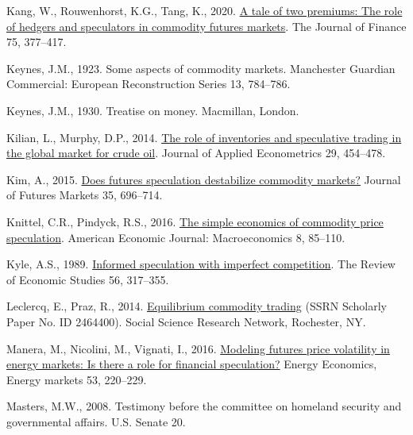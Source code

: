 \documentclass[]{elsarticle} %
\newlength{\cslhangindent}
\newlength{\cslentryspacingunit} %
\newenvironment{CSLReferences}[2] %
 {%
  \setlength{\parindent}{0pt}
  \ifodd #1
  \let\oldpar\par
  \def\par{\hangindent=\cslhangindent\oldpar}
  \fi
  \setlength{\parskip}{#2\cslentryspacingunit}
 }%
 {}
\begin{document}
\begin{CSLReferences}{1}{0}
\leavevmode{}%
Kang, W., Rouwenhorst, K.G., Tang, K., 2020. \href{https://doi.org/10.1111/jofi.12845}{A tale of two premiums: The role of hedgers and speculators in commodity futures markets}. The Journal of Finance 75, 377--417.

\leavevmode{}%
Keynes, J.M., 1923. Some aspects of commodity markets. Manchester Guardian Commercial: European Reconstruction Series 13, 784--786.

\leavevmode{}%
Keynes, J.M., 1930. Treatise on money. Macmillan, London.

\leavevmode{}%
Kilian, L., Murphy, D.P., 2014. \href{https://doi.org/10.1002/jae.2322}{The role of inventories and speculative trading in the global market for crude oil}. Journal of Applied Econometrics 29, 454--478.

\leavevmode{}%
Kim, A., 2015. \href{https://doi.org/10.1002/fut.21716}{Does futures speculation destabilize commodity markets?} Journal of Futures Markets 35, 696--714.

\leavevmode{}%
Knittel, C.R., Pindyck, R.S., 2016. \href{https://doi.org/10.1257/mac.20140033}{The simple economics of commodity price speculation}. American Economic Journal: Macroeconomics 8, 85--110.

\leavevmode{}%
Kyle, A.S., 1989. \href{https://doi.org/10.2307/2297551}{Informed speculation with imperfect competition}. The Review of Economic Studies 56, 317--355.

\leavevmode{}%
Leclercq, E., Praz, R., 2014. \href{https://doi.org/10.2139/ssrn.2464400}{Equilibrium commodity trading} (SSRN Scholarly Paper No. ID 2464400). Social Science Research Network, Rochester, NY.

\leavevmode{}%
Manera, M., Nicolini, M., Vignati, I., 2016. \href{https://doi.org/10.1016/j.eneco.2014.07.001}{Modeling futures price volatility in energy markets: Is there a role for financial speculation?} Energy Economics, Energy markets 53, 220--229.

\leavevmode{}%
Masters, M.W., 2008. Testimony before the committee on homeland security and governmental affairs. U.S. Senate 20.


\end{CSLReferences}
\end{document}
